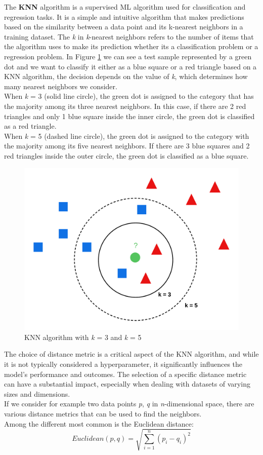 The \textbf{KNN} algorithm is a supervised ML algorithm used for classification and regression tasks.
It is a simple and intuitive algorithm that makes predictions based on the similarity between a data point and its k-nearest neighbors in a training dataset.
The \textit{k} in \textit{k}-nearest neighbors refers to the number of items that the algorithm uses to make its prediction whether its a classification problem or a regression problem.
In Figure \ref{fig:knn} we can see a test sample represented by a green dot and we want to classify 
it either as a blue square or a red triangle based on a KNN algorithm, the decision depends on the value of \textit{k}, which determines how many nearest neighbors we consider.\\
When \textit{k} = 3 (solid line circle), the green dot is assigned to the category that has the majority among its three nearest neighbors. 
In this case, if there are 2 red triangles and only 1 blue square inside the inner circle, the green dot is classified as a red triangle. \\
When \textit{k} = 5 (dashed line circle), the green dot is assigned to the category with the majority among its five nearest neighbors. 
If there are 3 blue squares and 2 red triangles inside the outer circle, the green dot is classified as a blue square.
\begin{figure}[H]
    \centering
    \includegraphics[width=0.85\linewidth]{graphics/KNeighbours.png}
    \caption{KNN algorithm with \textit{k} = 3 and \textit{k} = 5}
    \label{fig:knn}
\end{figure}

The choice of distance metric is a critical aspect of the KNN algorithm, and while it is not typically considered a hyperparameter, it significantly influences the model's performance and outcomes. 
The selection of a specific distance metric can have a substantial impact, especially when dealing with datasets of varying sizes and dimensions. \\
If we consider for example two data points \textit{p}, \textit{q} in \textit{n}-dimensional space, there are various distance metrics that can be used to find the neighbors.\\
Among the different  most common is the Euclidean distance: 
\begin{equation}
    Euclidean(p,q) = \sqrt{\sum_{i=1}^{n} (p_i - q_i)^2}
    \label{formula:distance}
\end{equation}

